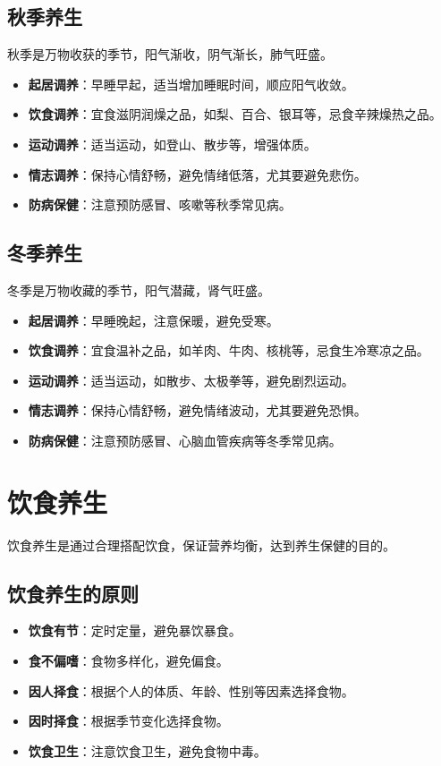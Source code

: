 \documentclass[12pt,UTF8]{ctexbook}
\begin{document}
\subsection{秋季养生}

秋季是万物收获的季节，阳气渐收，阴气渐长，肺气旺盛。

\begin{itemize}
\item \textbf{起居调养}：早睡早起，适当增加睡眠时间，顺应阳气收敛。
\item \textbf{饮食调养}：宜食滋阴润燥之品，如梨、百合、银耳等，忌食辛辣燥热之品。
\item \textbf{运动调养}：适当运动，如登山、散步等，增强体质。
\item \textbf{情志调养}：保持心情舒畅，避免情绪低落，尤其要避免悲伤。
\item \textbf{防病保健}：注意预防感冒、咳嗽等秋季常见病。
\end{itemize}

\subsection{冬季养生}

冬季是万物收藏的季节，阳气潜藏，肾气旺盛。

\begin{itemize}
\item \textbf{起居调养}：早睡晚起，注意保暖，避免受寒。
\item \textbf{饮食调养}：宜食温补之品，如羊肉、牛肉、核桃等，忌食生冷寒凉之品。
\item \textbf{运动调养}：适当运动，如散步、太极拳等，避免剧烈运动。
\item \textbf{情志调养}：保持心情舒畅，避免情绪波动，尤其要避免恐惧。
\item \textbf{防病保健}：注意预防感冒、心脑血管疾病等冬季常见病。
\end{itemize}

\section{饮食养生}

饮食养生是通过合理搭配饮食，保证营养均衡，达到养生保健的目的。

\subsection{饮食养生的原则}

\begin{itemize}
\item \textbf{饮食有节}：定时定量，避免暴饮暴食。
\item \textbf{食不偏嗜}：食物多样化，避免偏食。
\item \textbf{因人择食}：根据个人的体质、年龄、性别等因素选择食物。
\item \textbf{因时择食}：根据季节变化选择食物。
\item \textbf{饮食卫生}：注意饮食卫生，避免食物中毒。
\end{itemize}
\end{document}
